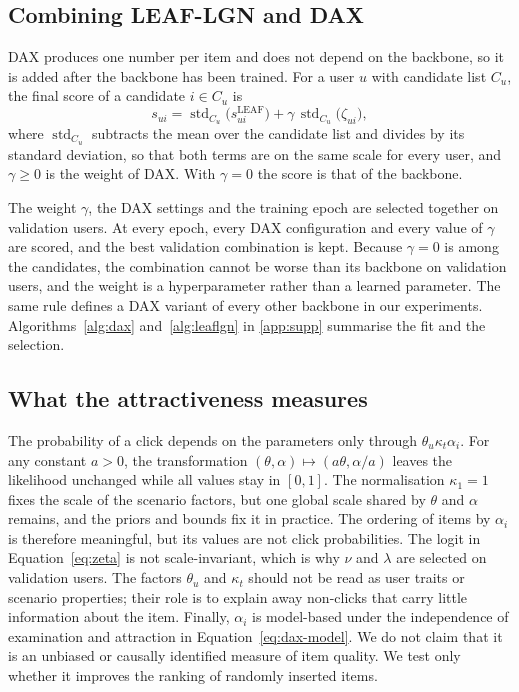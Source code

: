 \documentclass[preprint,12pt,authoryear]{elsarticle}
\begin{document}
\subsection{Combining LEAF-LGN and DAX}
\label{sec:method-combine}

DAX produces one number per item and does not depend on the backbone, so it is added after the backbone has been trained. For a user
$u$ with candidate list $C_u$, the final score of a candidate $i\in C_u$ is
\begin{equation}
  s_{ui}=\operatorname{std}_{C_u}\bigl(s^{\mathrm{LEAF}}_{ui}\bigr)+\gamma\,\operatorname{std}_{C_u}\bigl(\zeta_{ui}\bigr),
  \label{eq:combine}
\end{equation}
where $\operatorname{std}_{C_u}$ subtracts the mean over the candidate list and divides by its standard deviation, so that both terms are on
the same scale for every user, and $\gamma\ge0$ is the weight of DAX. With $\gamma=0$ the score is that of the backbone.

The weight $\gamma$, the DAX settings and the training epoch are selected together on validation users. At every epoch, every DAX configuration
and every value of $\gamma$ are scored, and the best validation combination is kept. Because $\gamma=0$ is among the candidates, the combination
cannot be worse than its backbone on validation users, and the weight is a hyperparameter rather than a learned parameter. The same rule defines a
DAX variant of every other backbone in our experiments. Algorithms~\ref{alg:dax} and~\ref{alg:leaflgn} in \ref{app:supp} summarise the fit and the selection.

\subsection{What the attractiveness measures}
\label{sec:method-identify}

The probability of a click depends on the parameters only through $\theta_u\kappa_t\alpha_i$. For any constant $a>0$, the transformation
$(\theta,\alpha)\mapsto(a\theta,\alpha/a)$ leaves the likelihood unchanged while all values stay in $[0,1]$. The normalisation $\kappa_1=1$ fixes
the scale of the scenario factors, but one global scale shared by $\theta$ and $\alpha$ remains, and the priors and bounds fix it in practice.
The ordering of items by $\alpha_i$ is therefore meaningful, but its values are not click probabilities. The logit in Equation~\eqref{eq:zeta} is
not scale-invariant, which is why $\nu$ and $\lambda$ are selected on validation users. The factors $\theta_u$ and $\kappa_t$ should not be read as
user traits or scenario properties; their role is to explain away non-clicks that carry little information about the item. Finally, $\alpha_i$ is
model-based under the independence of examination and attraction in Equation~\eqref{eq:dax-model}. We do not claim that it is an unbiased or
causally identified measure of item quality. We test only whether it improves the ranking of randomly inserted items.
\end{document}
